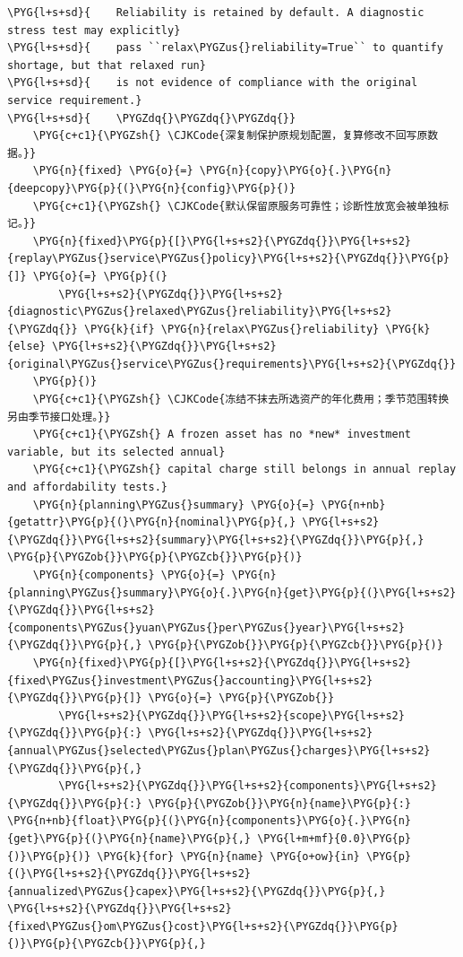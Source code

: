 \begin{Verbatim}
\PYG{l+s+sd}{    Reliability is retained by default. A diagnostic stress test may explicitly}
\PYG{l+s+sd}{    pass ``relax\PYGZus{}reliability=True`` to quantify shortage, but that relaxed run}
\PYG{l+s+sd}{    is not evidence of compliance with the original service requirement.}
\PYG{l+s+sd}{    \PYGZdq{}\PYGZdq{}\PYGZdq{}}
    \PYG{c+c1}{\PYGZsh{} \CJKCode{深复制保护原规划配置，复算修改不回写原数据。}}
    \PYG{n}{fixed} \PYG{o}{=} \PYG{n}{copy}\PYG{o}{.}\PYG{n}{deepcopy}\PYG{p}{(}\PYG{n}{config}\PYG{p}{)}
    \PYG{c+c1}{\PYGZsh{} \CJKCode{默认保留原服务可靠性；诊断性放宽会被单独标记。}}
    \PYG{n}{fixed}\PYG{p}{[}\PYG{l+s+s2}{\PYGZdq{}}\PYG{l+s+s2}{replay\PYGZus{}service\PYGZus{}policy}\PYG{l+s+s2}{\PYGZdq{}}\PYG{p}{]} \PYG{o}{=} \PYG{p}{(}
        \PYG{l+s+s2}{\PYGZdq{}}\PYG{l+s+s2}{diagnostic\PYGZus{}relaxed\PYGZus{}reliability}\PYG{l+s+s2}{\PYGZdq{}} \PYG{k}{if} \PYG{n}{relax\PYGZus{}reliability} \PYG{k}{else} \PYG{l+s+s2}{\PYGZdq{}}\PYG{l+s+s2}{original\PYGZus{}service\PYGZus{}requirements}\PYG{l+s+s2}{\PYGZdq{}}
    \PYG{p}{)}
    \PYG{c+c1}{\PYGZsh{} \CJKCode{冻结不抹去所选资产的年化费用；季节范围转换另由季节接口处理。}}
    \PYG{c+c1}{\PYGZsh{} A frozen asset has no *new* investment variable, but its selected annual}
    \PYG{c+c1}{\PYGZsh{} capital charge still belongs in annual replay and affordability tests.}
    \PYG{n}{planning\PYGZus{}summary} \PYG{o}{=} \PYG{n+nb}{getattr}\PYG{p}{(}\PYG{n}{nominal}\PYG{p}{,} \PYG{l+s+s2}{\PYGZdq{}}\PYG{l+s+s2}{summary}\PYG{l+s+s2}{\PYGZdq{}}\PYG{p}{,} \PYG{p}{\PYGZob{}}\PYG{p}{\PYGZcb{}}\PYG{p}{)}
    \PYG{n}{components} \PYG{o}{=} \PYG{n}{planning\PYGZus{}summary}\PYG{o}{.}\PYG{n}{get}\PYG{p}{(}\PYG{l+s+s2}{\PYGZdq{}}\PYG{l+s+s2}{components\PYGZus{}yuan\PYGZus{}per\PYGZus{}year}\PYG{l+s+s2}{\PYGZdq{}}\PYG{p}{,} \PYG{p}{\PYGZob{}}\PYG{p}{\PYGZcb{}}\PYG{p}{)}
    \PYG{n}{fixed}\PYG{p}{[}\PYG{l+s+s2}{\PYGZdq{}}\PYG{l+s+s2}{fixed\PYGZus{}investment\PYGZus{}accounting}\PYG{l+s+s2}{\PYGZdq{}}\PYG{p}{]} \PYG{o}{=} \PYG{p}{\PYGZob{}}
        \PYG{l+s+s2}{\PYGZdq{}}\PYG{l+s+s2}{scope}\PYG{l+s+s2}{\PYGZdq{}}\PYG{p}{:} \PYG{l+s+s2}{\PYGZdq{}}\PYG{l+s+s2}{annual\PYGZus{}selected\PYGZus{}plan\PYGZus{}charges}\PYG{l+s+s2}{\PYGZdq{}}\PYG{p}{,}
        \PYG{l+s+s2}{\PYGZdq{}}\PYG{l+s+s2}{components}\PYG{l+s+s2}{\PYGZdq{}}\PYG{p}{:} \PYG{p}{\PYGZob{}}\PYG{n}{name}\PYG{p}{:} \PYG{n+nb}{float}\PYG{p}{(}\PYG{n}{components}\PYG{o}{.}\PYG{n}{get}\PYG{p}{(}\PYG{n}{name}\PYG{p}{,} \PYG{l+m+mf}{0.0}\PYG{p}{)}\PYG{p}{)} \PYG{k}{for} \PYG{n}{name} \PYG{o+ow}{in} \PYG{p}{(}\PYG{l+s+s2}{\PYGZdq{}}\PYG{l+s+s2}{annualized\PYGZus{}capex}\PYG{l+s+s2}{\PYGZdq{}}\PYG{p}{,} \PYG{l+s+s2}{\PYGZdq{}}\PYG{l+s+s2}{fixed\PYGZus{}om\PYGZus{}cost}\PYG{l+s+s2}{\PYGZdq{}}\PYG{p}{)}\PYG{p}{\PYGZcb{}}\PYG{p}{,}

\end{Verbatim}
